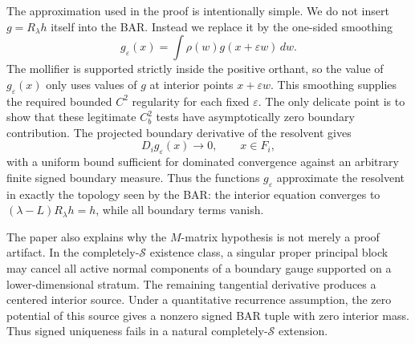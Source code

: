 \documentclass[aihp]{imsart}
\numberwithin{equation}{section}
\theoremstyle{plain}
\theoremstyle{definition}
\newcommand{\1}{\mathbf 1}
\begin{document}
The approximation used in the proof is intentionally simple.  We do not insert
$g=R_\lambda h$ itself into the BAR.  Instead we replace it by the one-sided
smoothing
\[
        g_\varepsilon(x)=\int \rho(w)g(x+\varepsilon w)\,dw .
\]
The mollifier is supported strictly inside the positive orthant, so the value of
$g_\varepsilon(x)$ only uses values of $g$ at interior points $x+\varepsilon w$.
This smoothing supplies the required bounded $C^2$ regularity for each fixed
$\varepsilon$.  The only delicate point is to show that these legitimate
$C_b^2$ tests have asymptotically zero boundary contribution.  The projected
boundary derivative of the resolvent gives
\[
        D_i g_\varepsilon(x)\longrightarrow 0,\qquad x\in F_i,
\]
with a uniform bound sufficient for dominated convergence against an arbitrary
finite signed boundary measure.  Thus the functions $g_\varepsilon$ approximate
the resolvent in exactly the topology seen by the BAR: the interior equation
converges to $(\lambda-L)R_\lambda h=h$, while all boundary terms vanish.

The paper also explains why the $M$-matrix hypothesis is not merely a proof artifact.  In the completely-$\mathcal{S}$ existence class, a singular proper principal block may cancel all active normal components of a boundary gauge supported on a lower-dimensional stratum.  The remaining tangential derivative produces a centered interior source.  Under a quantitative recurrence assumption, the zero potential of this source gives a nonzero signed BAR tuple with zero interior mass.  Thus signed uniqueness fails in a natural completely-$\mathcal{S}$ extension.
\end{document}

